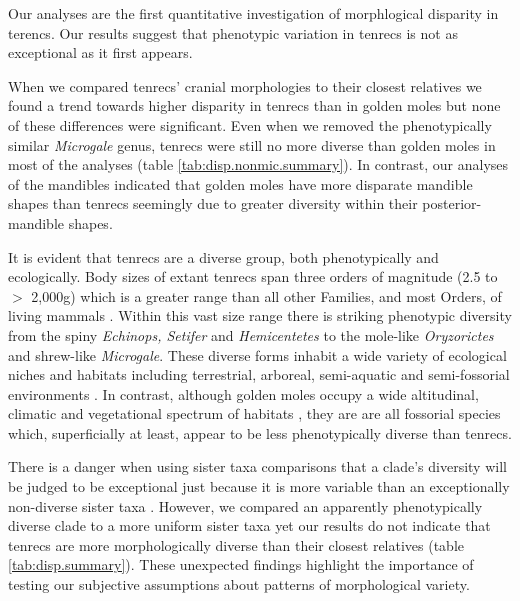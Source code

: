 \documentclass[12pt,a4paper]{article}
\begin{document}
	Our analyses are the first quantitative investigation of morphlogical disparity in terencs. Our results suggest that phenotypic variation in tenrecs is not as exceptional as it first appears.
	 
	When we compared tenrecs' cranial morphologies to their closest relatives we found a trend towards higher disparity in tenrecs than in golden moles but none of these differences were significant. Even when we removed the phenotypically similar \textit{Microgale} genus, tenrecs were still no more diverse than golden moles in most of the analyses (table \ref{tab:disp.nonmic.summary}). In contrast, our analyses of the mandibles indicated that golden moles have more disparate mandible shapes than tenrecs seemingly due to greater diversity within their posterior-mandible shapes.

	
	It is evident that tenrecs are a diverse group, both phenotypically and ecologically. Body sizes of extant tenrecs span three orders of magnitude (2.5 to $>$ 2,000g) which is a greater range than all other Families, and most Orders, of living mammals \citep{Olson2003}. Within this vast size range there is striking phenotypic diversity from the spiny \textit{Echinops, Setifer} and \textit{Hemicentetes} to the mole-like \textit{Oryzorictes} and shrew-like \textit{Microgale}. These diverse forms inhabit a wide variety of ecological niches and habitats including terrestrial, arboreal, semi-aquatic and semi-fossorial environments \citep{Soarimalala2011}. 
	In contrast, although golden moles occupy a wide altitudinal, climatic and vegetational spectrum of habitats \citep{Bronner1995}, they are are all fossorial species which, superficially at least, appear to be less phenotypically diverse than tenrecs. 
	
	There is a danger when using sister taxa comparisons that a clade's diversity will be judged to be exceptional just because it is more variable than an exceptionally non-diverse sister taxa \citep{Losos2002}. However, we compared an apparently phenotypically diverse clade to a more uniform sister taxa yet our results do not indicate that tenrecs are more morphologically diverse than their closest relatives (table \ref{tab:disp.summary}). These unexpected findings highlight the importance of testing our subjective assumptions about patterns of morphological variety.
	
	
   

	
	
\end{document}
